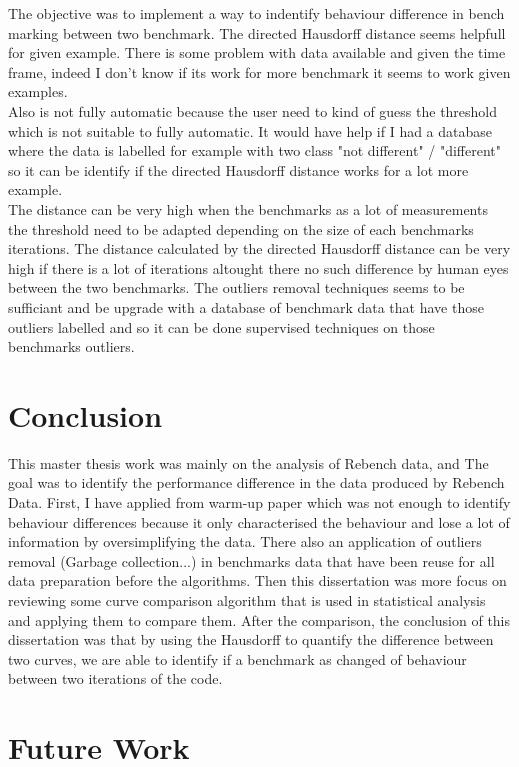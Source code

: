 \documentclass{article}
\begin{document}
The objective was to implement a way to indentify behaviour difference in bench marking between two benchmark. The directed Hausdorff distance seems helpfull for given example. There is some problem with data available and given the time frame, indeed I don't know if its work for more benchmark it seems to work given examples. \\
Also is not fully automatic because the user need to kind of guess the threshold which is not suitable to fully automatic. It would have help if I had a database where the data is labelled for example with two class "not different" / "different" so it can be identify if the directed Hausdorff distance works for a lot more example. \\
The distance can be very high when the benchmarks as a lot of measurements the threshold need to be adapted depending on the size of each benchmarks iterations. The distance calculated by the directed Hausdorff distance can be very high if there is a lot of iterations altought there no such difference by human eyes between the two benchmarks.
The outliers removal techniques seems to be sufficiant and be upgrade with a database of benchmark data that have those outliers labelled and so it can be done supervised techniques on those benchmarks outliers.



\section{Conclusion}


This master thesis work was mainly on the analysis of Rebench data, and The goal was to identify the performance difference in the data produced by Rebench Data. First, I have applied from \citep{barrett2017virtual} warm-up paper which was not enough to identify behaviour differences because it only characterised the behaviour and lose a lot of information by oversimplifying the data. There also an application of outliers removal (Garbage collection...) in benchmarks data that have been reuse for all data preparation before the algorithms.  Then this dissertation was more focus on reviewing some curve comparison algorithm that is used in statistical analysis and applying them to compare them. After the comparison, the conclusion of this dissertation was that by using the Hausdorff to quantify the difference between two curves, we are able to identify if a benchmark as changed of behaviour between two iterations of the code.

\section{Future Work}
\end{document}
